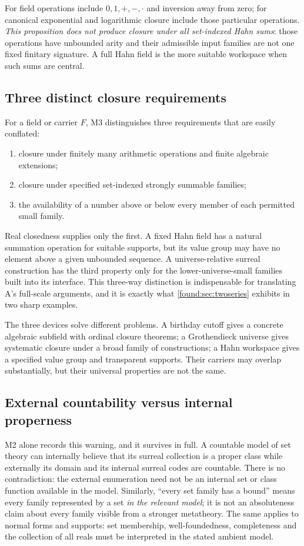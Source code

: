 \documentclass[11pt,letterpaper]{article}
\numberwithin{equation}{section}
\theoremstyle{definition}
\theoremstyle{remark}
\begin{document}
For field operations include $0,1,+,-,\cdot$ and inversion away from zero; for
canonical exponential and logarithmic closure include those particular
operations. \emph{This proposition does not produce closure under all
set-indexed Hahn sums}: those operations have unbounded arity and their
admissible input families are not one fixed finitary signature. A full Hahn
field is the more suitable workspace when such sums are central.

\subsection{Three distinct closure requirements}
\label{found:sub:threeclosures}
For a field or carrier $F$, M3 distinguishes three requirements that are easily
conflated:
\begin{enumerate}
\item closure under finitely many arithmetic operations and finite algebraic
extensions;
\item closure under specified set-indexed strongly summable families;
\item the availability of a number above or below every member of each
permitted small family.
\end{enumerate}
Real closedness supplies only the first. A fixed Hahn field has a natural
summation operation for suitable supports, but its value group may have no
element above a given unbounded sequence. A universe-relative surreal
construction has the third property only for the lower-universe-small families
built into its interface. This three-way distinction is indispensable for
translating A's full-scale arguments, and it is exactly what
\cref{found:sec:twoseries} exhibits in two sharp examples.

The three devices solve different problems. A birthday cutoff gives a concrete
algebraic subfield with ordinal closure theorems; a Grothendieck universe gives
systematic closure under a broad family of constructions; a Hahn workspace gives
a specified value group and transparent supports. Their carriers may overlap
substantially, but their universal properties are not the same.

\subsection{External countability versus internal properness}
\label{found:sub:countable}
M2 alone records this warning, and it survives in full. A countable model of set
theory can internally believe that its surreal collection is a proper class
while externally its domain and its internal surreal codes are countable. There
is no contradiction: the external enumeration need not be an internal set or
class function available in the model. Similarly, ``every set family has a
bound'' means every family represented by a set \emph{in the relevant model}; it
is not an absoluteness claim about every family visible from a stronger
metatheory. The same applies to normal forms and supports: set membership,
well-foundedness, completeness and the collection of all reals must be
interpreted in the stated ambient model.
\end{document}
